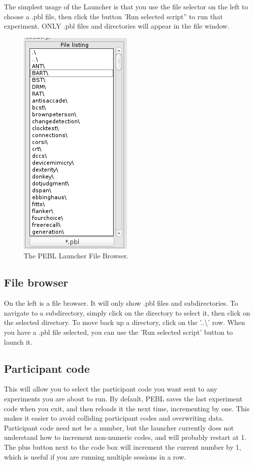 The simplest usage of the Launcher is that you use the file selector on
the left to choose a .pbl file, then click the button 'Run selected
script'' to run that experiment.  ONLY .pbl files and directories will
appear in the file window.
\clearpage
{}

\begin{figure}
 \vspace{-40pt}
  \begin{center}
    \includegraphics[scale=.5]{filebrowser.png} 
  \end{center}
  \caption{The PEBL Launcher File Browser.}
 \vspace{-50pt}
\end{figure}
\subsection{File browser}
On the left is a file browser.  It will only show .pbl files and
subdirectories.  To navigate to a subdirectory, simply click on the
directory to select it, then click on the selected directory.  To move
back up a directory, click on the '..\textbackslash' row.  When you have a .pbl file
selected, you can use the 'Run selected script' button to launch it.


\subsection{Participant code}
This will allow you to select the participant code you want sent to
any experiments you are about to run.  By default, PEBL saves the last
experiment code when you exit, and then reloads it the next time,
incrementing by one.  This makes it easier to avoid colliding
participant codes and overwriting data.  Participant code need not be
a number, but the launcher currently does not understand how to
increment non-numeric codes, and will probably restart at 1.  The plus button next to the 
code box will increment the current number by 1, which is useful if you are running multiple sessions in a row.

